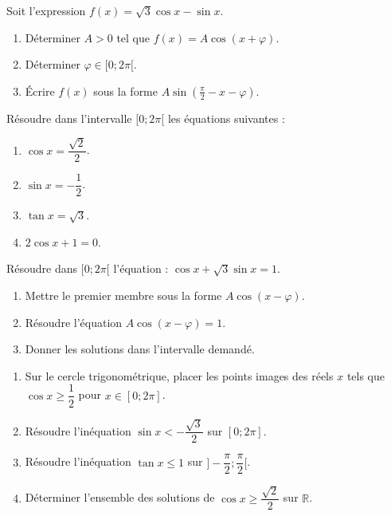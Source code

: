 \documentclass[11pt]{article}
\begin{document}
\begin{exercice}
Soit l'expression $f(x) = \sqrt{3}\cos x - \sin x$.
\begin{enumerate}
    \item Déterminer $A > 0$ tel que $f(x) = A\cos(x+\varphi)$.
    \item Déterminer $\varphi \in [0; 2\pi[$.
    \item Écrire $f(x)$ sous la forme $A\sin(\frac{\pi}{2} - x - \varphi)$.
\end{enumerate}
\end{exercice}

\begin{exercice}
Résoudre dans l'intervalle $[0; 2\pi[$ les équations suivantes :
\begin{enumerate}
    \item $\cos x = \dfrac{\sqrt{2}}{2}$.
    \item $\sin x = -\dfrac{1}{2}$.
    \item $\tan x = \sqrt{3}$.
    \item $2\cos x + 1 = 0$.
\end{enumerate}
\end{exercice}

\begin{exercice}[Équation de la forme $a\cos x + b\sin x = c$]
Résoudre dans $[0; 2\pi[$ l'équation : $\cos x + \sqrt{3}\sin x = 1$.
\begin{enumerate}
    \item Mettre le premier membre sous la forme $A\cos(x-\varphi)$.
    \item Résoudre l'équation $A\cos(x-\varphi) = 1$.
    \item Donner les solutions dans l'intervalle demandé.
\end{enumerate}
\end{exercice}

\begin{exercice}
\begin{enumerate}
    \item Sur le cercle trigonométrique, placer les points images des réels $x$ tels que $\cos x \geq \dfrac{1}{2}$ pour $x \in [0; 2\pi]$.
    \item Résoudre l'inéquation $\sin x < -\dfrac{\sqrt{3}}{2}$ sur $[0; 2\pi]$.
    \item Résoudre l'inéquation $\tan x \leq 1$ sur $]-\dfrac{\pi}{2}; \dfrac{\pi}{2}[$.
    \item Déterminer l'ensemble des solutions de $\cos x \geq \dfrac{\sqrt{2}}{2}$ sur $\mathbb{R}$.
\end{enumerate}
\end{exercice}
\end{document}
